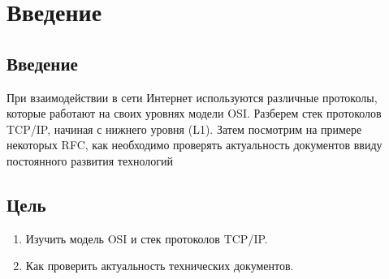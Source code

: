 \chapter{Введение}
\label{ch:intro}

\section{Введение}

При взаимодействии в сети Интернет используются различные протоколы, которые
работают на своих уровнях модели OSI. Разберем стек протоколов TCP/IP, начиная с нижнего
уровня (L1). Затем посмотрим на примере некоторых RFC, как необходимо проверять
актуальность документов ввиду постоянного развития технологий

\section{Цель}  

\begin{enumerate}
    \item Изучить модель OSI и стек протоколов TCP/IP.
    \item Как проверить актуальность технических документов.
\end{enumerate}
 
\endinput
